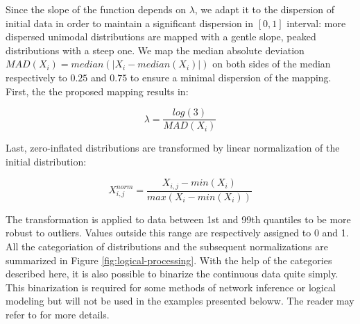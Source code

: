 \documentclass[a4paper,12pt,twoside,onecolumn,openright,final,oldfontcommands]{memoir}
\begin{document}
Since the slope of the function depends on \(\lambda\), we adapt it to
the dispersion of initial data in order to maintain a significant
dispersion in \([0, 1]\) interval: more dispersed unimodal distributions
are mapped with a gentle slope, peaked distributions with a steep one.
We map the median absolute deviation
\(MAD(X_{i})=median(|X_{i}-median(X_i)|)\) on both sides of the median
respectively to \(0.25\) and \(0.75\) to ensure a minimal dispersion of
the mapping. First, the the proposed mapping results in:

\[\lambda=\dfrac{log(3)}{MAD(X_i)}\]

Last, zero-inflated distributions are transformed by linear
normalization of the initial distribution:

\[X_{i, j}^{norm}=\dfrac{X_{i, j}-min(X_{i})}{max(X_{i}-min(X_{i}))}\]

The transformation is applied to data between 1st and 99th quantiles to
be more robust to outliers. Values outside this range are respectively
assigned to 0 and 1. All the categoriation of distributions and the
subsequent normalizations are summarized in Figure
\ref{fig:logical-processing}. With the help of the categories described
here, it is also possible to binarize the continuous data quite simply.
This binarization is required for some methods of network inference or
logical modeling but will not be used in the examples presented beloww.
The reader may refer to \citet{beal2019personalization} for more
details.
\end{document}
